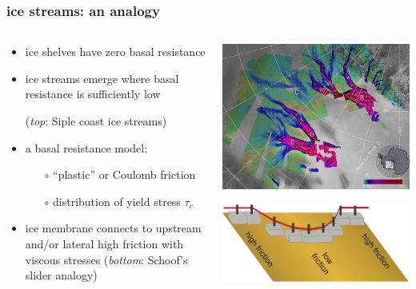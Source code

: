 \documentclass{beamer}
\begin{document}
\begin{frame}
  \frametitle{ice streams: an analogy}

\begin{columns}
\begin{column}{0.6\textwidth}
\begin{itemize}
\item ice shelves have zero basal resistance
\item ice streams emerge where basal resistance is sufficiently low

(\emph{top}: Siple coast ice streams)
\item a basal resistance model:
  \begin{itemize}
  \item[$\circ$] ``plastic'' or Coulomb friction 
  \item[$\circ$] distribution of yield stress $\tau_c$
  \end{itemize}
\item ice membrane connects to upstream and/or lateral high friction with viscous stresses (\emph{bottom}: Schoof's slider analogy)
\end{itemize}
\end{column}
\begin{column}{0.4\textwidth}
\includegraphics[width=\textwidth]{siple}

\vspace{0.3in}

\includegraphics[width=1.1\textwidth]{schoof-sliders}
\end{column}
\end{columns}
\end{frame}
\end{document}
